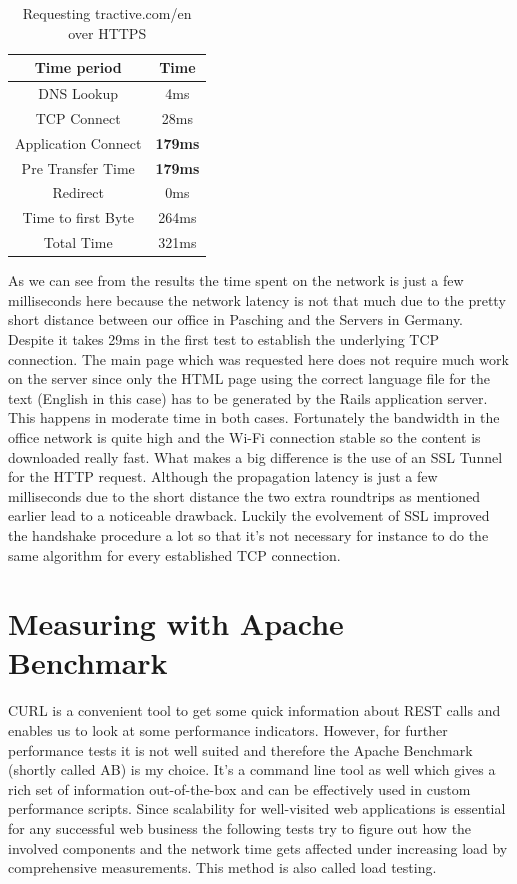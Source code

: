 \begin{table}[h]
\begin{center}
\begin{tabular}{| c | c |}
    \hline
    Time period & Time  \\ \hline
    DNS Lookup & 4ms  \\ \hline
    TCP Connect & 28ms \\ \hline
    Application Connect & \textbf{179ms} \\ \hline 
    Pre Transfer Time & \textbf{179ms} \\ \hline
    Redirect & 0ms\\ \hline
    Time to first Byte & 264ms \\ \hline
    Total Time & 321ms \\
    \hline
\end{tabular}
\caption{Requesting tractive.com/en over HTTPS}
\end{center}
\end{table}

As we can see from the results the time spent on the network is just a few milliseconds here because the network latency is not that much due to the pretty short distance between our office in Pasching and the Servers in Germany. Despite it takes 29ms in the first test to establish the underlying TCP connection. The main page which was requested here does not require much work on the server since only the HTML page using the correct language file for the text (English in this case) has to be generated by the Rails application server. This happens in moderate time in both cases. Fortunately the bandwidth in the office network is quite high and the Wi-Fi connection stable so the content is downloaded really fast. What makes a big difference is the use of an SSL Tunnel for the HTTP request. Although the propagation latency is just a few milliseconds due to the short distance the two extra roundtrips as mentioned earlier lead to a noticeable drawback. Luckily the evolvement of SSL improved the handshake procedure a lot so that it's not necessary for instance to do the same algorithm for every established TCP connection.

\section{Measuring with Apache Benchmark}

CURL is a convenient tool to get some quick information about REST calls and enables us to look at some performance indicators. However, for further performance tests it is not well suited and therefore the Apache Benchmark (shortly called AB) is my choice. It's a command line tool as well which gives a rich set of information out-of-the-box and can be effectively used in custom performance scripts. Since scalability for well-visited web applications is essential for any successful web business the following tests try to figure out how the involved components and the network time gets affected under increasing load by comprehensive measurements. This method is also called load testing.

